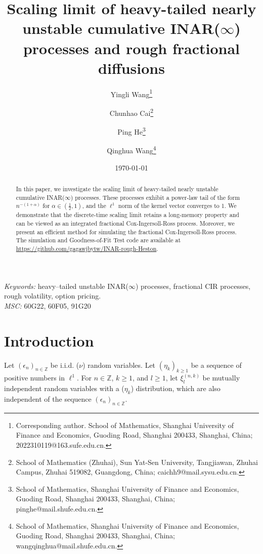 \documentclass[letterpaper]{article}
\numberwithin{equation}{section}
\theoremstyle{definition}
\theoremstyle{remark}
\begin{document}
\title{Scaling limit of heavy-tailed nearly unstable cumulative INAR($\infty$) processes and rough fractional diffusions}

\author{%
Yingli Wang\thanks{Corresponding author. School of Mathematics, Shanghai University of Finance and Economics, Guoding Road, Shanghai 200433, Shanghai, China; 2022310119@163.sufe.edu.cn.}%
\and
Chunhao Cai\thanks{School of Mathematics (Zhuhai), Sun Yat-Sen University, Tangjiawan, Zhuhai Campus, Zhuhai 519082, Guangdong, China; caichh9@mail.sysu.edu.cn.}%
\and
Ping He\thanks{School of Mathematics, Shanghai University of Finance and Economics, Guoding Road, Shanghai 200433, Shanghai, China; pinghe@mail.shufe.edu.cn.}%
\and
Qinghua Wang\thanks{School of Mathematics, Shanghai University of Finance and Economics, Guoding Road, Shanghai 200433, Shanghai, China; wangqinghua@mail.shufe.edu.cn.}%
}

\date{\today}



\maketitle

\begin{abstract}
In this paper, we investigate the scaling limit of heavy-tailed nearly unstable cumulative INAR($\infty$) processes. These processes exhibit a power-law tail of the form $n^{-(1+\alpha)}$ for $\alpha \in (\frac{1}{2}, 1)$, and the $\ell^1$ norm of the kernel vector converges to 1. We demonstrate that the discrete-time scaling limit retains a long-memory property and can be viewed as an integrated fractional Cox-Ingersoll-Ross process. Moreover, we present an efficient method for simulating the fractional Cox-Ingersoll-Ross process. The simulation and Goodness-of-Fit Test code are available at \url{https://github.com/gagawjbytw/INAR-rough-Heston}.
\end{abstract}

\noindent%
{\it Keywords:} heavy--tailed unstable INAR($\infty$) processes, fractional CIR processes, rough volatility, option pricing.\\

\noindent%
{\it MSC:}  60G22, 60F05, 91G20



\section{Introduction}
Let $(\epsilon_n)_{n\in\mathbb{Z}}$ be i.i.d. ($\nu$) random variables. Let $(\eta_k)_{k\ge1}$ be a sequence of positive numbers in $\ell^1$. For $n \in \mathbb{Z}$, $k \ge 1$, and $l \ge 1$, let $\xi_l^{(n,k)}$ be mutually independent random variables with a ($\eta_k$) distribution, which are also independent of the sequence $(\epsilon_n)_{n\in\mathbb{Z}}$.
\end{document}
